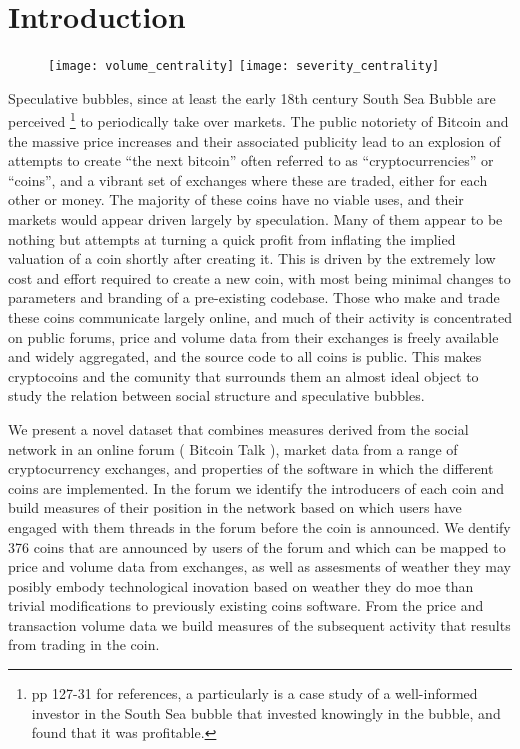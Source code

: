 \section{Introduction}

\begin{figure}[h]
\texttt{[image: volume\_centrality]}
\texttt{[image: severity\_centrality]}
\end{figure}

Speculative bubbles, since at least the early 18th century South Sea Bubble are perceived \footnote{\cite{garber2001famous} pp 127-31 for references, a particularly is \cite{temin2004riding} a case study of a well-informed investor in the South Sea bubble that invested knowingly in the bubble, and found that it was profitable. } to periodically take over markets. %
The public notoriety of Bitcoin and the massive price increases and their associated publicity  lead to an explosion of attempts to create ``the next bitcoin'' often referred to as ``cryptocurrencies'' or ``coins'', and a vibrant set of exchanges where these are traded, either for each other or money.
The majority of these coins have no viable uses, and their markets would appear driven largely by speculation.
Many of them appear to be nothing but attempts at turning a quick profit from inflating the implied valuation of a coin shortly after creating it.
This is driven by the extremely low cost and effort required to create a new coin, with most being minimal changes to parameters and branding of a pre-existing codebase.
Those who make and trade these coins communicate largely online, and much of their activity is concentrated on public forums, price and volume data from their exchanges is freely available and widely aggregated, and the source code to all coins is public.
This makes cryptocoins and the comunity that surrounds them an almost ideal object to study the relation between social structure and speculative bubbles.



We present a novel dataset that combines measures derived from the social network in an online forum ( Bitcoin Talk ), market data from a range of cryptocurrency exchanges, and properties of the software in which the different coins are implemented.
In the forum we identify the introducers of each coin and build measures of their position in the network based on which users have engaged with them threads in the forum before the coin is announced.
We dentify 376 coins that are announced by users of the forum and which can be mapped to price and volume data from exchanges, as well as assesments of weather they may posibly embody technological inovation based on weather they do moe than trivial modifications to previously existing coins software.
From the price and transaction volume data we build measures of the subsequent activity that results from trading in the coin. 


